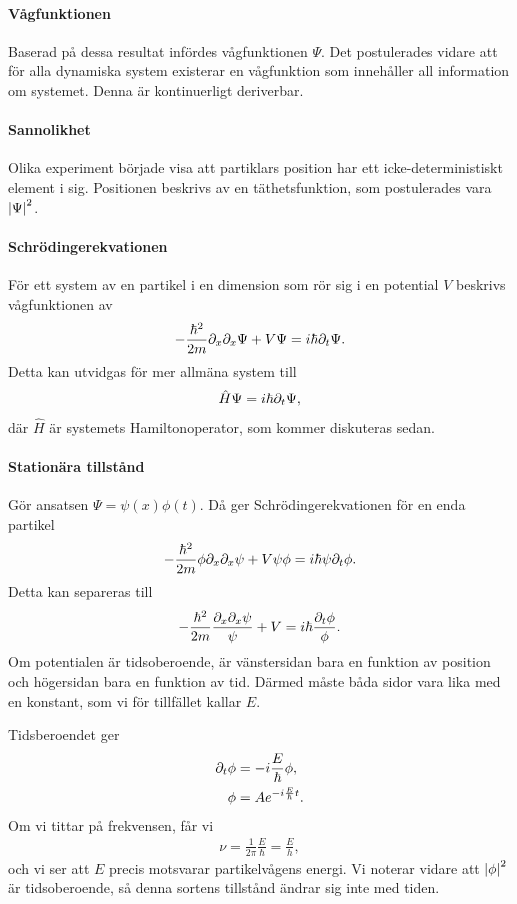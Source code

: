 \paragraph{Vågfunktionen}
Baserad på dessa resultat infördes vågfunktionen $\Psi$. Det postulerades vidare att för alla dynamiska system existerar en vågfunktion som innehåller all information om systemet.
Denna är kontinuerligt deriverbar.

\paragraph{Sannolikhet}
Olika experiment började visa att partiklars position har ett icke-deterministiskt element i sig. Positionen beskrivs av en täthetsfunktion, som postulerades vara $\abs{\Psi}^{2}$.

\paragraph{Schrödingerekvationen}
För ett system av en partikel i en dimension som rör sig i en potential $V$ beskrivs vågfunktionen av
\begin{align*}
	-\frac{\hbar^{2}}{2m}\partial_{x}\partial_{x}\Psi + V\Psi = i\hbar\partial_{t}\Psi.
\end{align*}
Detta kan utvidgas för mer allmäna system till
\begin{align*}
	\hat{H}\Psi = i\hbar\partial_{t}\Psi,
\end{align*}
där $\hat{H}$ är systemets Hamiltonoperator, som kommer diskuteras sedan.

\paragraph{Stationära tillstånd}
Gör ansatsen $\Psi = \psi(x)\phi(t)$. Då ger Schrödingerekvationen för en enda partikel
\begin{align*}
	-\frac{\hbar^{2}}{2m}\phi\partial_{x}\partial_{x}\psi + V\psi\phi = i\hbar\psi\partial_{t}\phi.
\end{align*}
Detta kan separeras till
\begin{align*}
	-\frac{\hbar^{2}}{2m}\frac{\partial_{x}\partial_{x}\psi}{\psi} + V = i\hbar\frac{\partial_{t}\phi}{\phi}.
\end{align*}
Om potentialen är tidsoberoende, är vänstersidan bara en funktion av position och högersidan bara en funktion av tid. Därmed måste båda sidor vara lika med en konstant, som vi för tillfället kallar $E$.

Tidsberoendet ger
\begin{align*}
	\partial_{t}\phi &= -i\frac{E}{\hbar}\phi, \\
	\phi          &= Ae^{-i\frac{E}{\hbar}t}.
\end{align*}
Om vi tittar på frekvensen, får vi
\begin{align*}
	\nu = \frac{1}{2\pi}\frac{E}{\hbar} = \frac{E}{h},
\end{align*}
och vi ser att $E$ precis motsvarar partikelvågens energi. Vi noterar vidare att $\abs{\phi}^{2}$ är tidsoberoende, så denna sortens tillstånd ändrar sig inte med tiden.

